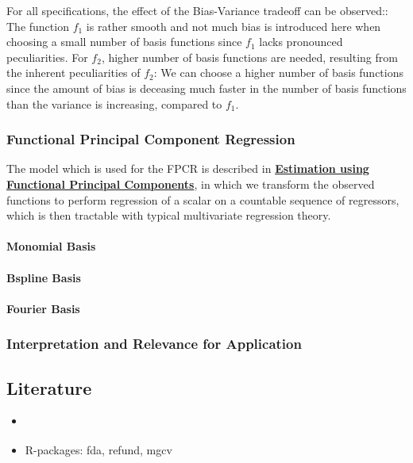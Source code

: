 \documentclass[11pt,twoside,a4paper]{article}
\begin{document}
	
	For all specifications, the effect of the Bias-Variance tradeoff can be observed:: The function $f_1$ is rather smooth and not much bias is introduced here when choosing a small number of basis functions since $f_1$ lacks pronounced peculiarities. For $f_2$, higher number of basis functions are needed, resulting from the inherent peculiarities of $f_2$: We can choose a higher number of basis functions since the amount of bias is deceasing much faster in the number of basis functions than the variance is increasing, compared to $f_1$. 
	
	
	
	\subsubsection{Functional Principal Component Regression}
	The model which is used for the FPCR is described in \hyperref[fpc_exp_transf]{\textbf{Estimation using Functional Principal Components}}, in which we transform the observed functions to perform regression of a scalar on a countable sequence of regressors, which is then tractable with typical multivariate regression theory. 

	
	\paragraph{Monomial Basis}
	\paragraph{Bspline Basis}
	\paragraph{Fourier Basis}
	
	\subsubsection{Interpretation and Relevance for Application}

	\subsection{Literature}
	\begin{itemize}
		\item \cite{shonkwiler_explorations_2009}
		\item R-packages: fda, refund, mgcv
	\end{itemize}
	
	\newpage
\end{document}
